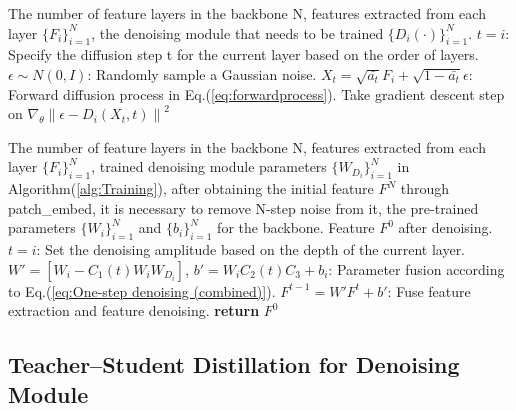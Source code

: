 \documentclass[conference]{IEEEtran}
\begin{document}
{\begin{algorithm}[t]
	\renewcommand{\algorithmicrequire}{\textbf{Input:}}
	\renewcommand{\algorithmicensure}{\textbf{Output:}}
	\caption{Training}
	\label{alg:Training}
	\begin{algorithmic}[1]
		\Require The number of feature layers in the backbone N, features extracted from each layer $\{F_i\}_{i=1}^{N} $, the denoising module that needs to be trained $\{D_i(\cdot )\}_{i=1}^{N}$.
            \Repeat
		\State $t = i$: Specify the diffusion step t for the current layer based on the order of layers.
		\State $\epsilon \sim N(0,I)$: Randomly sample a Gaussian noise.
            \State $X_t = \sqrt{\bar{a_t} }F_i+\sqrt{1-\bar{a_t} } \epsilon$:  Forward diffusion process in Eq.(\ref{eq:forwardprocess}).
		\State Take gradient descent step on 
                    $\nabla _\theta \left \| \epsilon-D_i(X_t,t )  \right \|^{2} $
            
            \EndFor
	\end{algorithmic}  
\end{algorithm}

\begin{algorithm}
	\renewcommand{\algorithmicrequire}{\textbf{Input:}}
	\renewcommand{\algorithmicensure}{\textbf{Output:}}
	\caption{Inference}
	\label{alg:Inference}
	\begin{algorithmic}[1]
		\Require The number of feature layers in the backbone N, features extracted from each layer $\{F_i\}_{i=1}^{N} $, trained denoising module parameters $\{W_{D_i}\}_{i=1}^{N}$ in Algorithm(\ref{alg:Training}), after obtaining the initial feature $F^{N}$ through patch\_embed, it is necessary to remove N-step noise from it, the pre-trained parameters $\{W_i\}_{i=1}^{N} $ and $\{b_i\}_{i=1}^{N} $ for the backbone.
		\Ensure Feature $F^{0}$ after denoising.
		\State $t = i$: Set the denoising amplitude based on the depth of the current layer.
            \State $W' = [W_i - C_1(t) W_iW_{D_i}]$, 
            $b' = W_iC_2(t)C_3 + b_i$: Parameter fusion according to Eq.(\ref{eq:One-step denoising (combined)}).
            \State $F^{t-1} = W'F^{t} + b'$: Fuse feature extraction and feature denoising.
	\EndFor
		\State \textbf{return} $F^{0}$
	\end{algorithmic}  
\end{algorithm}




\subsection{Teacher--Student Distillation for Denoising Module}
\label{sec:method_distill}

}
\end{document}
